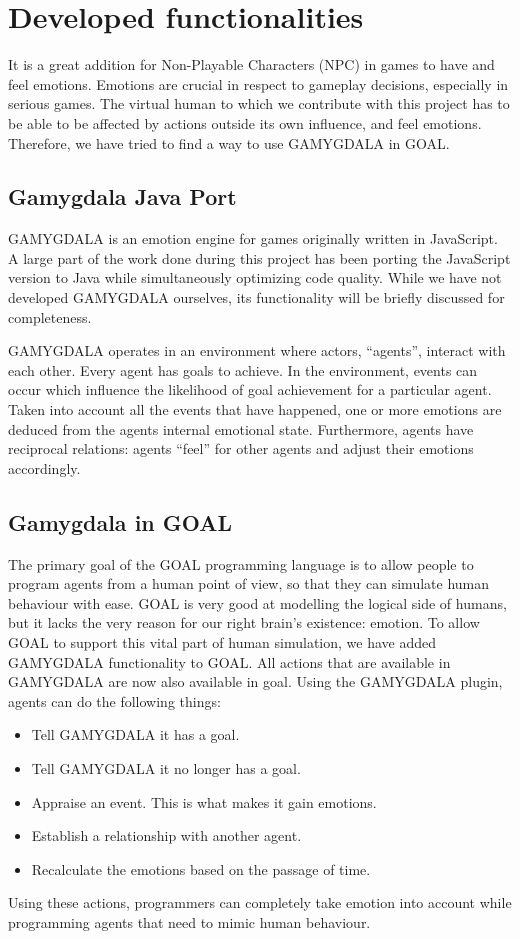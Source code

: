 \section{Developed functionalities}
It is a great addition for Non-Playable Characters (NPC) in games to have and feel emotions. Emotions are crucial in respect to gameplay decisions, especially in serious games. The virtual human to which we contribute with this project has to be able to be affected by actions outside its own influence, and feel emotions. Therefore, we have tried to find a way to use GAMYGDALA \citep{gamygdala} in GOAL.

\subsection{Gamygdala Java Port}
GAMYGDALA is an emotion engine for games originally written in JavaScript. A large part of the work done during this project has been porting the JavaScript version to Java while simultaneously optimizing code quality. While we have not developed GAMYGDALA ourselves, its functionality will be briefly discussed for completeness.

GAMYGDALA operates in an environment where actors, ``agents'', interact with each other. Every agent has goals to achieve. In the environment, events can occur which influence the likelihood of goal achievement for a particular agent. Taken into account all the events that have happened, one or more emotions are deduced from the agents internal emotional state. Furthermore, agents have reciprocal relations: agents ``feel'' for other agents and adjust their emotions accordingly.

\subsection{Gamygdala in GOAL}
The primary goal of the GOAL programming language is to allow people to program agents from a human point of view, so that they can simulate human behaviour with ease. GOAL is very good at modelling the logical side of humans, but it lacks the very reason for our right brain's existence: emotion. To allow GOAL to support this vital part of human simulation, we have added GAMYGDALA functionality to GOAL. All actions that are available in GAMYGDALA are now also available in goal. Using the GAMYGDALA plugin, agents can do the following things:
\begin{itemize}
	\item Tell GAMYGDALA it has a goal.
	\item Tell GAMYGDALA it no longer has a goal.
	\item Appraise an event. This is what makes it gain emotions.
	\item Establish a relationship with another agent.
	\item Recalculate the emotions based on the passage of time.
\end{itemize}
Using these actions, programmers can completely take emotion into account while programming agents that need to mimic human behaviour.
